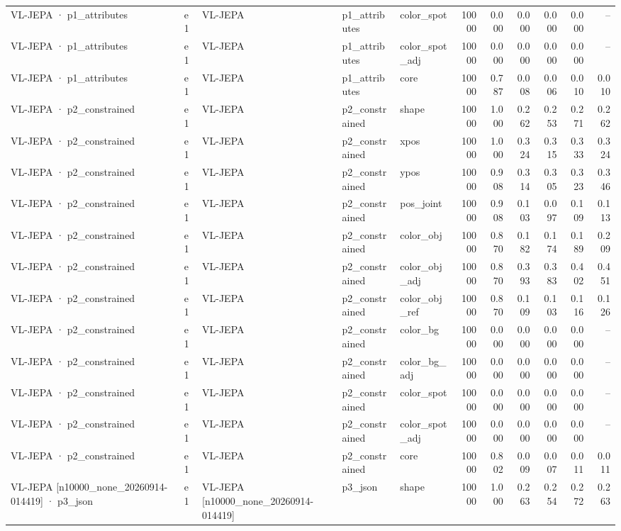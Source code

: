 \begin{tabular}{lllllrrrrrr}
VL-JEPA · p1\_attributes & e1 & VL-JEPA & p1\_attributes & color\_spot & 10000 & 0.000 & 0.000 & 0.000 & 0.000 & -- \\
VL-JEPA · p1\_attributes & e1 & VL-JEPA & p1\_attributes & color\_spot\_adj & 10000 & 0.000 & 0.000 & 0.000 & 0.000 & -- \\
VL-JEPA · p1\_attributes & e1 & VL-JEPA & p1\_attributes & core & 10000 & 0.787 & 0.008 & 0.006 & 0.010 & 0.010 \\
VL-JEPA · p2\_constrained & e1 & VL-JEPA & p2\_constrained & shape & 10000 & 1.000 & 0.262 & 0.253 & 0.271 & 0.262 \\
VL-JEPA · p2\_constrained & e1 & VL-JEPA & p2\_constrained & xpos & 10000 & 1.000 & 0.324 & 0.315 & 0.333 & 0.324 \\
VL-JEPA · p2\_constrained & e1 & VL-JEPA & p2\_constrained & ypos & 10000 & 0.908 & 0.314 & 0.305 & 0.323 & 0.346 \\
VL-JEPA · p2\_constrained & e1 & VL-JEPA & p2\_constrained & pos\_joint & 10000 & 0.908 & 0.103 & 0.097 & 0.109 & 0.113 \\
VL-JEPA · p2\_constrained & e1 & VL-JEPA & p2\_constrained & color\_obj & 10000 & 0.870 & 0.182 & 0.174 & 0.189 & 0.209 \\
VL-JEPA · p2\_constrained & e1 & VL-JEPA & p2\_constrained & color\_obj\_adj & 10000 & 0.870 & 0.393 & 0.383 & 0.402 & 0.451 \\
VL-JEPA · p2\_constrained & e1 & VL-JEPA & p2\_constrained & color\_obj\_ref & 10000 & 0.870 & 0.109 & 0.103 & 0.116 & 0.126 \\
VL-JEPA · p2\_constrained & e1 & VL-JEPA & p2\_constrained & color\_bg & 10000 & 0.000 & 0.000 & 0.000 & 0.000 & -- \\
VL-JEPA · p2\_constrained & e1 & VL-JEPA & p2\_constrained & color\_bg\_adj & 10000 & 0.000 & 0.000 & 0.000 & 0.000 & -- \\
VL-JEPA · p2\_constrained & e1 & VL-JEPA & p2\_constrained & color\_spot & 10000 & 0.000 & 0.000 & 0.000 & 0.000 & -- \\
VL-JEPA · p2\_constrained & e1 & VL-JEPA & p2\_constrained & color\_spot\_adj & 10000 & 0.000 & 0.000 & 0.000 & 0.000 & -- \\
VL-JEPA · p2\_constrained & e1 & VL-JEPA & p2\_constrained & core & 10000 & 0.802 & 0.009 & 0.007 & 0.011 & 0.011 \\
VL-JEPA [n10000\_none\_20260914-014419] · p3\_json & e1 & VL-JEPA [n10000\_none\_20260914-014419] & p3\_json & shape & 10000 & 1.000 & 0.263 & 0.254 & 0.272 & 0.263 \\

\end{tabular}
